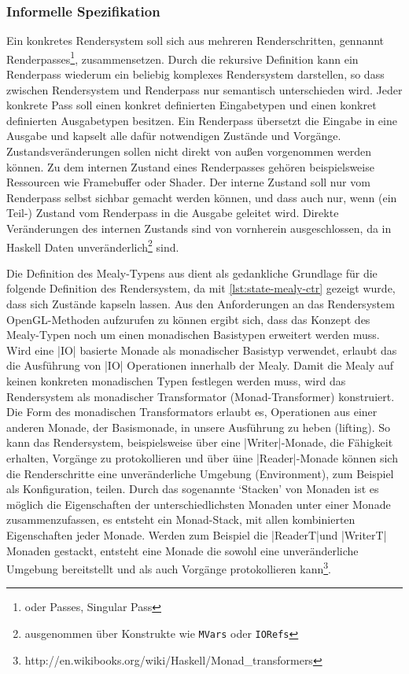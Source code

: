 \subsubsection{Informelle Spezifikation}
Ein konkretes Rendersystem soll sich aus mehreren Renderschritten, gennannt Renderpasses\footnote{oder Passes, Singular Pass}, zusammensetzen. Durch die rekursive Definition kann ein Renderpass wiederum ein beliebig komplexes Rendersystem darstellen, so dass zwischen Rendersystem und Renderpass nur semantisch unterschieden wird. Jeder konkrete Pass soll einen konkret definierten Eingabetypen und einen konkret definierten Ausgabetypen besitzen. Ein Renderpass übersetzt die Eingabe in eine Ausgabe und kapselt alle dafür notwendigen Zustände und Vorgänge. Zustandsveränderungen sollen nicht direkt von außen vorgenommen werden können. Zu dem internen Zustand eines Renderpasses gehören beispielsweise Ressourcen wie Framebuffer oder Shader. Der interne Zustand soll nur vom Renderpass selbst sichbar gemacht werden können, und dass auch nur, wenn (ein Teil-) Zustand vom Renderpass in die Ausgabe geleitet wird. Direkte Veränderungen des internen Zustands sind von vornherein ausgeschlossen, da in Haskell Daten unveränderlich\footnote{ausgenommen über Konstrukte wie \texttt{MVars} oder \texttt{IORefs}} sind.

Die Definition des Mealy-Typens aus  dient als gedankliche Grundlage für die folgende Definition des Rendersystem, da mit \ref{lst:state-mealy-ctr} gezeigt wurde, dass sich Zustände kapseln lassen. Aus den Anforderungen an das Rendersystem OpenGL-Methoden aufzurufen zu können ergibt sich, dass das Konzept des Mealy-Typen noch um einen monadischen Basistypen erweitert werden muss. Wird eine |IO| basierte Monade als monadischer Basistyp verwendet, erlaubt das die Ausführung von |IO| Operationen innerhalb der Mealy. Damit die Mealy auf keinen konkreten monadischen Typen festlegen werden muss, wird das Rendersystem als monadischer Transformator (Monad-Transformer) konstruiert. Die Form des monadischen Transformators erlaubt es, Operationen aus einer anderen Monade, der Basismonade, in unsere Ausführung zu heben (lifting). So kann das Rendersystem, beispielsweise über eine |Writer|-Monade, die Fähigkeit erhalten, Vorgänge zu protokollieren und über üine |Reader|-Monade können sich die Renderschritte eine unveränderliche Umgebung (Environment), zum Beispiel als Konfiguration, teilen. Durch das sogenannte `Stacken' von Monaden ist es möglich die Eigenschaften der unterschiedlichsten Monaden unter einer Monade zusammenzufassen, es entsteht ein Monad-Stack, mit allen kombinierten Eigenschaften jeder Monade. Werden zum Beispiel die |ReaderT|\footnotemark und |WriterT| Monaden gestackt, entsteht eine Monade die sowohl eine unveränderliche Umgebung bereitstellt und als auch Vorgänge protokollieren kann\footnote{http://en.wikibooks.org/wiki/Haskell/Monad\_transformers}.

